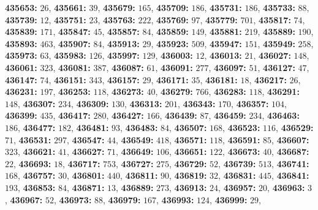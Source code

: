 \textsf{\bfseries 435653:} $26$, \textsf{\bfseries 435661:} $39$, \textsf{\bfseries 435679:} $165$, \textsf{\bfseries 435709:} $186$, \textsf{\bfseries 435731:} $186$, \textsf{\bfseries 435733:} $88$, \textsf{\bfseries 435739:} $12$, \textsf{\bfseries 435751:} $23$, \textsf{\bfseries 435763:} $222$, \textsf{\bfseries 435769:} $97$, \textsf{\bfseries 435779:} $701$, \textsf{\bfseries 435817:} $74$, \textsf{\bfseries 435839:} $171$, \textsf{\bfseries 435847:} $45$, \textsf{\bfseries 435857:} $84$, \textsf{\bfseries 435859:} $149$, \textsf{\bfseries 435881:} $219$, \textsf{\bfseries 435889:} $190$, \textsf{\bfseries 435893:} $463$, \textsf{\bfseries 435907:} $84$, \textsf{\bfseries 435913:} $29$, \textsf{\bfseries 435923:} $509$, \textsf{\bfseries 435947:} $151$, \textsf{\bfseries 435949:} $258$, \textsf{\bfseries 435973:} $63$, \textsf{\bfseries 435983:} $126$, \textsf{\bfseries 435997:} $129$, \textsf{\bfseries 436003:} $12$, \textsf{\bfseries 436013:} $21$, \textsf{\bfseries 436027:} $148$, \textsf{\bfseries 436061:} $323$, \textsf{\bfseries 436081:} $387$, \textsf{\bfseries 436087:} $61$, \textsf{\bfseries 436091:} $277$, \textsf{\bfseries 436097:} $51$, \textsf{\bfseries 436127:} $47$, \textsf{\bfseries 436147:} $74$, \textsf{\bfseries 436151:} $343$, \textsf{\bfseries 436157:} $29$, \textsf{\bfseries 436171:} $35$, \textsf{\bfseries 436181:} $18$, \textsf{\bfseries 436217:} $26$, \textsf{\bfseries 436231:} $197$, \textsf{\bfseries 436253:} $118$, \textsf{\bfseries 436273:} $40$, \textsf{\bfseries 436279:} $766$, \textsf{\bfseries 436283:} $118$, \textsf{\bfseries 436291:} $148$, \textsf{\bfseries 436307:} $234$, \textsf{\bfseries 436309:} $130$, \textsf{\bfseries 436313:} $201$, \textsf{\bfseries 436343:} $170$, \textsf{\bfseries 436357:} $104$, \textsf{\bfseries 436399:} $435$, \textsf{\bfseries 436417:} $280$, \textsf{\bfseries 436427:} $166$, \textsf{\bfseries 436439:} $87$, \textsf{\bfseries 436459:} $234$, \textsf{\bfseries 436463:} $186$, \textsf{\bfseries 436477:} $182$, \textsf{\bfseries 436481:} $93$, \textsf{\bfseries 436483:} $84$, \textsf{\bfseries 436507:} $168$, \textsf{\bfseries 436523:} $116$, \textsf{\bfseries 436529:} $71$, \textsf{\bfseries 436531:} $297$, \textsf{\bfseries 436547:} $44$, \textsf{\bfseries 436549:} $418$, \textsf{\bfseries 436571:} $118$, \textsf{\bfseries 436591:} $85$, \textsf{\bfseries 436607:} $323$, \textsf{\bfseries 436621:} $41$, \textsf{\bfseries 436627:} $71$, \textsf{\bfseries 436649:} $106$, \textsf{\bfseries 436651:} $122$, \textsf{\bfseries 436673:} $40$, \textsf{\bfseries 436687:} $22$, \textsf{\bfseries 436693:} $18$, \textsf{\bfseries 436717:} $753$, \textsf{\bfseries 436727:} $275$, \textsf{\bfseries 436729:} $52$, \textsf{\bfseries 436739:} $513$, \textsf{\bfseries 436741:} $168$, \textsf{\bfseries 436757:} $30$, \textsf{\bfseries 436801:} $440$, \textsf{\bfseries 436811:} $90$, \textsf{\bfseries 436819:} $32$, \textsf{\bfseries 436831:} $445$, \textsf{\bfseries 436841:} $193$, \textsf{\bfseries 436853:} $84$, \textsf{\bfseries 436871:} $13$, \textsf{\bfseries 436889:} $273$, \textsf{\bfseries 436913:} $24$, \textsf{\bfseries 436957:} $20$, \textsf{\bfseries 436963:} $3$, \textsf{\bfseries 436967:} $52$, \textsf{\bfseries 436973:} $88$, \textsf{\bfseries 436979:} $167$, \textsf{\bfseries 436993:} $124$, \textsf{\bfseries 436999:} $29$, 
